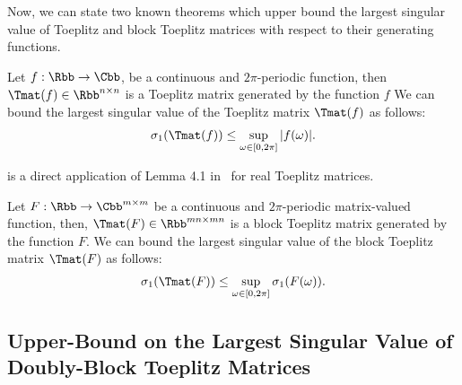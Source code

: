 Now, we can state two known theorems which upper bound the largest singular value of Toeplitz and block Toeplitz matrices with respect to their generating functions.
\begin{theorem} \label{theorem:teoplitz_sup_singular}
  Let $f: \Rbb \rightarrow \Cbb$, be a continuous and $2\pi$-periodic function, then $\Tmat(f) \in \Rbb^{n \times n}$ is a Toeplitz matrix generated by the function $f$
  We can bound the largest singular value of the Toeplitz matrix $\Tmat(f)$ as follows:
  \begin{align}
    \sigma_1 \left( \Tmat(f) \right) \leq \sup_{\omega \in [0, 2\pi]} |f(\omega)|.
  \end{align}
  \removespace
\end{theorem}
\noindent
{} is a direct application of Lemma 4.1 in~\citet{gray2006toeplitz} for real Toeplitz matrices. 

\begin{theorem} \label{theorem:block_teoplitz_sup_singular}
  Let $F: \Rbb \rightarrow \Cbb^{m \times m}$ be a continuous and $2 \pi$-periodic matrix-valued function, then, $\Tmat(F) \in \Rbb^{mn \times mn}$ is a block Toeplitz matrix generated by the function $F$.
  We can bound the largest singular value of the block Toeplitz matrix $\Tmat(F)$ as follows:
  \begin{align}
    \sigma_1 \left( \Tmat(F) \right) \leq \sup_{\omega \in [0, 2\pi]} \sigma_1 \left( F\left( \omega \right) \right) .
  \end{align}
  \removespace
\end{theorem}





\subsection{Upper-Bound on the Largest Singular Value of Doubly-Block Toeplitz Matrices}
\label{subsection:ch5-bound_on_the_singular_value_of_doubly-block_toeplitz_matrices}

